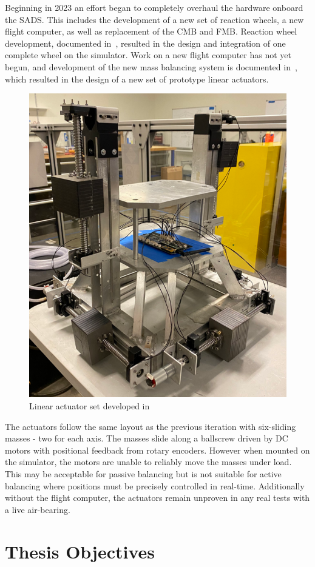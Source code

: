 Beginning in 2023 an effort began to completely overhaul the hardware onboard the SADS. This includes the development of a new set of reaction wheels, a new flight computer, as well as replacement of the CMB and FMB. Reaction wheel development, documented in~\cite{nalley2025development}, resulted in the design and integration of one complete wheel on the simulator. Work on a new flight computer has not yet begun, and development of the new mass balancing system is documented in~\cite{gilman_automatic_2024}, which resulted in the design of a new set of prototype linear actuators. 
\begin{figure}[h]\label{fig:gillman_final_work}
    \centering
    \includegraphics[width=0.70\linewidth]{figures/gillman_final_work.png}
    \caption{Linear actuator set developed in~\cite{gilman_automatic_2024}}
\end{figure}
The actuators follow the same layout as the previous iteration with six-sliding masses - two for each axis. The masses slide along a ballscrew driven by DC motors with positional feedback from rotary encoders. However when mounted on the simulator, the motors are unable to reliably move the masses under load. This may be acceptable for passive balancing but is not suitable for active balancing where positions must be precisely controlled in real-time. Additionally without the flight computer, the actuators remain unproven in any real tests with a live air-bearing. 

\section{Thesis Objectives} 

